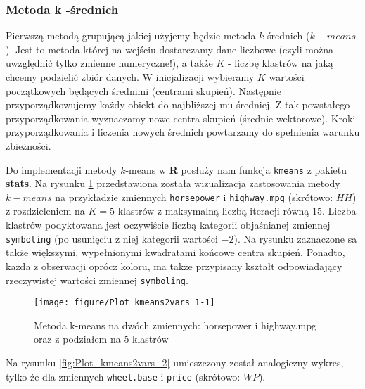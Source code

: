 \documentclass[12pt, a4paper]{article}\usepackage[]{graphicx}\usepackage[]{xcolor}
\makeatletter
\def\maxwidth{ %
  \ifdim\Gin@nat@width>\linewidth
    \linewidth
  \else
    \Gin@nat@width
  \fi
}
\newenvironment{knitrout}{}{} %
\makeatother
\begin{document}
\subsubsection{Metoda k -średnich}
Pierwszą metodą grupującą jakiej użyjemy będzie metoda $k$-średnich ($k-means$). Jest to metoda której na wejściu dostarczamy dane liczbowe (czyli można uwzględnić tylko zmienne numeryczne!), a także $K$ - liczbę klastrów na jaką chcemy podzielić zbiór danych. W inicjalizacji wybieramy $K$ wartości początkowych będących średnimi (centrami skupień). Następnie przyporządkowujemy każdy obiekt do najbliższej mu średniej. Z tak powstałego przyporządkowania wyznaczamy nowe centra skupień (średnie wektorowe). Kroki przyporządkowania i liczenia nowych średnich powtarzamy do spełnienia warunku zbieżności.

\par

Do implementacji metody $k$-means w \textbf{R} posłuży nam funkcja \texttt{kmeans} \cite{kmeans} z pakietu \textbf{stats}. Na rysunku \ref{fig:Plot_kmeans2vars_1} przedstawiona została wizualizacja zastosowania metody $k-means$ na przykładzie zmiennych \texttt{horsepower} i \texttt{highway.mpg} (skrótowo: $HH$) z rozdzieleniem na $K=5$ klastrów z maksymalną liczbą iteracji równą $15$. Liczba klastrów podyktowana jest oczywiście liczbą kategorii objaśnianej zmiennej \texttt{symboling} (po usunięciu z niej kategorii wartości $-2$). Na rysunku zaznaczone sa także większymi, wypełnionymi kwadratami końcowe centra skupień. Ponadto, każda z obserwacji oprócz koloru, ma także przypisany kształt odpowiadający rzeczywistej wartości zmiennej \texttt{symboling}. 


\begin{knitrout}
\color{fgcolor}\begin{figure}[H]

{\centering \texttt{[image: figure/Plot\_kmeans2vars\_1-1]} 

}

\caption[Metoda k-means na dwóch zmiennych]{Metoda k-means na dwóch zmiennych: horsepower i highway.mpg oraz z podziałem na 5 klastrów}\label{fig:Plot_kmeans2vars_1}
\end{figure}

\end{knitrout}

Na rysunku \ref{fig:Plot_kmeans2vars_2} umieszczony został analogiczny wykres, tylko że dla zmiennych \texttt{wheel.base} i \texttt{price} (skrótowo: $WP$).
\end{document}
